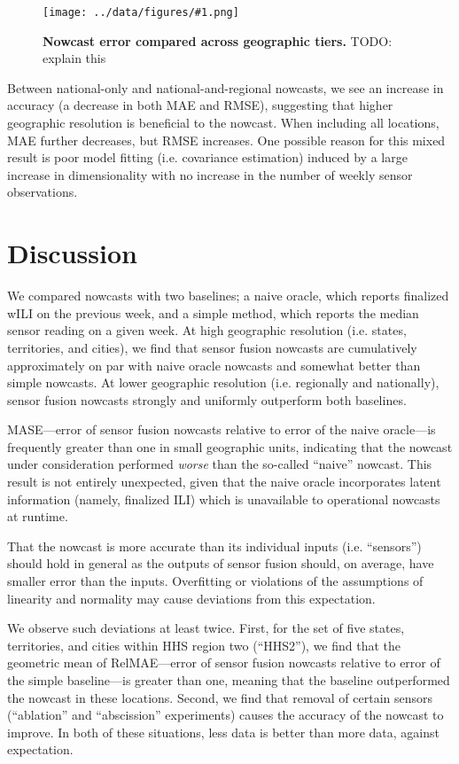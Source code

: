 \documentclass[10pt,letterpaper]{article}
\newcommand{\maybeincludegraphics}[1]{\texttt{[image: ../data/figures/\#1.png]}}
\begin{document}
\begin{figure}[!ht]
  \maybeincludegraphics{accuracy_vs_abscission}
  \caption{
    {\bf Nowcast error compared across geographic tiers.}
    TODO: explain this
  }
  \label{figure_accuracy_vs_abscission}
\end{figure}

Between national-only and national-and-regional nowcasts, we see an increase in
accuracy (a decrease in both MAE and RMSE), suggesting that higher geographic
resolution is beneficial to the nowcast. When including all locations, MAE
further decreases, but RMSE increases. One possible reason for this mixed
result is poor model fitting (i.e. covariance estimation) induced by a large
increase in dimensionality with no increase in the number of weekly sensor
observations.

\section*{Discussion}

We compared nowcasts with two baselines; a naive oracle, which reports
finalized wILI on the previous week, and a simple method, which reports the
median sensor reading on a given week. At high geographic resolution (i.e.
states, territories, and cities), we find that sensor fusion nowcasts are
cumulatively approximately on par with naive oracle nowcasts and somewhat
better than simple nowcasts. At lower geographic resolution (i.e. regionally
and nationally), sensor fusion nowcasts strongly and uniformly outperform both
baselines.

MASE---error of sensor fusion nowcasts relative to error of the naive
oracle---is frequently greater than one in small geographic units, indicating
that the nowcast under consideration performed \textit{worse} than the
so-called ``naive'' nowcast. This result is not entirely unexpected, given that
the naive oracle incorporates latent information (namely, finalized ILI) which
is unavailable to operational nowcasts at runtime.

That the nowcast is more accurate than its individual inputs (i.e. ``sensors'')
should hold in general as the outputs of sensor fusion should, on average, have
smaller error than the inputs. Overfitting or violations of the assumptions of
linearity and normality may cause deviations from this expectation.

We observe such deviations at least twice. First, for the set of five states,
territories, and cities within HHS region two (``HHS2''), we find that the
geometric mean of RelMAE---error of sensor fusion nowcasts relative to error of
the simple baseline---is greater than one, meaning that the baseline
outperformed the nowcast in these locations. Second, we find that removal of
certain sensors (``ablation'' and ``abscission'' experiments) causes the
accuracy of the nowcast to improve. In both of these situations, less data is
better than more data, against expectation.
\end{document}
